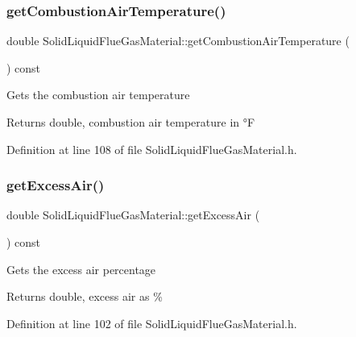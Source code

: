 \subsubsection{\texorpdfstring{get\+Combustion\+Air\+Temperature()}{getCombustionAirTemperature()}}
{\footnotesize\ttfamily double Solid\+Liquid\+Flue\+Gas\+Material\+::get\+Combustion\+Air\+Temperature (\begin{DoxyParamCaption}{ }\end{DoxyParamCaption}) const\hspace{0.3cm}{\ttfamily [inline]}}

Gets the combustion air temperature \begin{DoxyReturn}{Returns}
double, combustion air temperature in °F 
\end{DoxyReturn}


Definition at line 108 of file Solid\+Liquid\+Flue\+Gas\+Material.\+h.

\mbox{\label{class_solid_liquid_flue_gas_material_a49e7bb4ebc45897c81b6f38610ceaf02}} 
\subsubsection{\texorpdfstring{get\+Excess\+Air()}{getExcessAir()}}
{\footnotesize\ttfamily double Solid\+Liquid\+Flue\+Gas\+Material\+::get\+Excess\+Air (\begin{DoxyParamCaption}{ }\end{DoxyParamCaption}) const\hspace{0.3cm}{\ttfamily [inline]}}

Gets the excess air percentage \begin{DoxyReturn}{Returns}
double, excess air as \% 
\end{DoxyReturn}


Definition at line 102 of file Solid\+Liquid\+Flue\+Gas\+Material.\+h.

\mbox{\label{class_solid_liquid_flue_gas_material_aba4604158b3c624496d7de4b5fb511e2}} 
